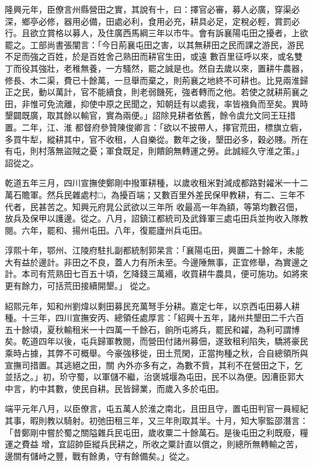 \begin{pinyinscope}
 隆興元年，臣僚言州縣營田之實，其說有十，曰：擇官必審，募人必廣，穿渠必深，鄉亭必修，器用必備，田處必利，食用必充，耕具必足，定稅必輕，賞罰必行。且欲立賞格以募人，及住廣西馬綱三年以市牛。會有訴襄陽屯田之擾者，上欲罷之。工部尚書張闡言：「今日荊襄屯田之害，以其無耕田之民而課之游民，游民不足而強之百姓，於是百姓舍己熟田而耕官生田，或遠
 數百里征呼以來，或名雙丁而役其強壯，老稚無養，一方騷然，罷之誠是也。然自去歲以來，置耕牛農器，修長、木二渠，費已十餘萬，一旦舉而棄之，則荊襄之地終不可耕也。比見兩淮歸正之民，動以萬計，官不能續食，則老弱饑死，強者轉而之他。若使之就耕荊襄之田，非惟可免流離，抑使中原之民聞之，知朝廷有以處我，率皆襁負而至矣。異時墾闢既廣，取其餘以輸官，實為兩便。」詔除見耕者依舊，餘令虞允文同王玨措置。二年，江、淮
 都督府參贊陳俊卿言：「欲以不披帶人，擇官荒田，標旗立砦，多買牛犁，縱耕其中，官不收租，人自樂從。數年之後，墾田必多，穀必賤。所在有屯，則村落無盜賊之憂；軍食既足，則饋餉無轉運之勞。此誠經久守淮之策。」詔從之。



 乾道五年三月，四川宣撫使鄭剛中撥軍耕種，以歲收租米對減成都路對糴米一十二萬石贍軍。然兵民雜處村□，為擾百端；又數百里外差民保甲教耕，有二、三年不代者，民甚苦之。知興元府晁公武欲以三年所
 收最高一年為額，等第均數召佃，放兵及保甲以護邊。從之。八月，詔鎮江都統司及武鋒軍三處屯田兵並拘收入隊教閱。六年，罷和、揚州屯田。八年，復罷廬州兵屯田。



 淳熙十年，鄂州、江陵府駐扎副都統制郭杲言：「襄陽屯田，興置二十餘年，未能大有益於邊計。非田之不良，蓋人力有所未至。今邊陲無事，正宜修舉，為實邊之計。本司有荒熟田七百五十頃，乞降錢三萬緡，收買耕牛農具，便可施功。如將來更有餘力，可括荒田接續開墾。」
 從之。



 紹熙元年，知和州劉煒以剩田募民充萬弩手分耕。嘉定七年，以京西屯田募人耕種。十三年，四川宣撫安丙、總領任處厚言：「紹興十五年，諸州共墾田二千六百五十餘頃，夏秋輸租米一十四萬一千餘石，餉所屯將兵，罷民和糴，為利可謂博矣。乾道四年以後，屯兵歸軍教閱，而營田付諸州募佃，遂致租利陷失，驕將豪民乘時占據，其弊不可概舉。今豪強移徙，田土荒閑，正當拘種之秋，合自總領所與宣撫司措置。其逃絕之田，關
 內外亦多有之，為數不貲，其利不在營田之下，乞並括之。」初，玠守蜀，以軍儲不繼，治褒城堰為屯田，民不以為便。因漕臣郭大中言，約中其數，使民自耕。民皆歸業，而歲入多於屯田。



 端平元年八月，以臣僚言，屯五萬人於淮之南北，且田且守，置屯田判官一員經紀其事，暇則教以騎射。初弛田租三年，又三年則取其半。十月，知大寧監邵潛言：「昔鄭剛中嘗於蜀之關隘雜兵民屯田，歲收粟二十餘萬石。是後屯田之利既廢，糧運之費益
 增，宜詔帥臣縱兵民耕之，所收之粟計直以償之，則總所無轉輸之苦，邊關有儲峙之豐，戰有餘勇，守有餘備矣。」從之。




\end{pinyinscope}
